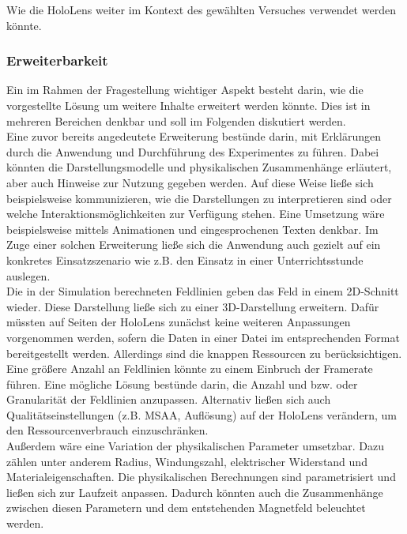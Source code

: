 Wie die HoloLens weiter im Kontext des gewählten Versuches verwendet werden könnte.

\subsubsection{Erweiterbarkeit}
Ein im Rahmen der Fragestellung wichtiger Aspekt besteht darin, wie die vorgestellte Lösung um weitere Inhalte erweitert werden könnte. Dies ist in mehreren Bereichen denkbar und soll im Folgenden diskutiert werden.\\

Eine zuvor bereits angedeutete Erweiterung bestünde darin, mit Erklärungen durch die Anwendung und Durchführung des Experimentes zu führen. Dabei könnten die Darstellungsmodelle und physikalischen Zusammenhänge erläutert, aber auch Hinweise zur Nutzung gegeben werden. Auf diese Weise ließe sich beispielsweise kommunizieren, wie die Darstellungen zu interpretieren sind oder welche Interaktionsmöglichkeiten zur Verfügung stehen. Eine Umsetzung wäre beispielsweise mittels Animationen und eingesprochenen Texten denkbar. Im Zuge einer solchen Erweiterung ließe sich die Anwendung auch gezielt auf ein konkretes Einsatzszenario wie z.B. den Einsatz in einer Unterrichtsstunde auslegen.\\

Die in der Simulation berechneten Feldlinien geben das Feld in einem 2D-Schnitt wieder. Diese Darstellung ließe sich zu einer 3D-Darstellung erweitern. Dafür müssten auf Seiten der HoloLens zunächst keine weiteren Anpassungen vorgenommen werden, sofern die Daten in einer Datei im entsprechenden Format bereitgestellt werden. Allerdings sind die knappen Ressourcen zu berücksichtigen. Eine größere Anzahl an Feldlinien könnte zu einem Einbruch der Framerate führen. Eine mögliche Lösung bestünde darin, die Anzahl und bzw. oder Granularität der Feldlinien anzupassen. Alternativ ließen sich auch Qualitätseinstellungen (z.B. MSAA, Auflösung) auf der HoloLens verändern, um den Ressourcenverbrauch einzuschränken.\\

Außerdem wäre eine Variation der physikalischen Parameter umsetzbar. Dazu zählen unter anderem Radius, Windungszahl, elektrischer Widerstand und Materialeigenschaften. Die physikalischen Berechnungen sind parametrisiert und ließen sich zur Laufzeit anpassen. Dadurch könnten auch die Zusammenhänge zwischen diesen Parametern und dem entstehenden Magnetfeld beleuchtet werden.\\

